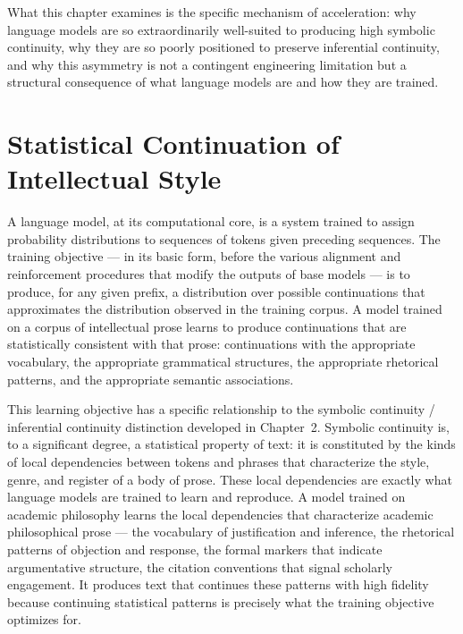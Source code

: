 \documentclass[12pt, openright, twoside]{book}
\begin{document}
What this chapter examines is the specific mechanism of
acceleration: why language models are so extraordinarily
well-suited to producing high symbolic continuity, why they
are so poorly positioned to preserve inferential continuity,
and why this asymmetry is not a contingent engineering
limitation but a structural consequence of what language
models are and how they are trained.

\section{Statistical Continuation of Intellectual Style}

A language model, at its computational core, is a system
trained to assign probability distributions to sequences
of tokens given preceding sequences. The training objective
--- in its basic form, before the various alignment and
reinforcement procedures that modify the outputs of base
models --- is to produce, for any given prefix, a
distribution over possible continuations that approximates
the distribution observed in the training corpus. A model
trained on a corpus of intellectual prose learns to produce
continuations that are statistically consistent with that
prose: continuations with the appropriate vocabulary,
the appropriate grammatical structures, the appropriate
rhetorical patterns, and the appropriate semantic
associations.

This learning objective has a specific relationship to the
symbolic continuity / inferential continuity distinction
developed in Chapter~2. Symbolic continuity is, to a
significant degree, a statistical property of text: it
is constituted by the kinds of local dependencies between
tokens and phrases that characterize the style, genre,
and register of a body of prose. These local dependencies
are exactly what language models are trained to learn and
reproduce. A model trained on academic philosophy learns
the local dependencies that characterize academic
philosophical prose --- the vocabulary of justification
and inference, the rhetorical patterns of objection and
response, the formal markers that indicate argumentative
structure, the citation conventions that signal scholarly
engagement. It produces text that continues these patterns
with high fidelity because continuing statistical patterns
is precisely what the training objective optimizes for.
\end{document}
